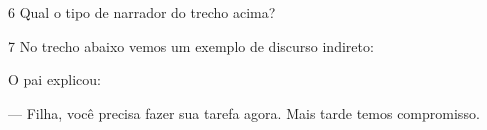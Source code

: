 
\num{6} Qual o tipo de narrador do trecho acima?


\pagebreak




\num{7} No trecho abaixo vemos um exemplo de discurso indireto:

\begin{myquote}

O pai explicou: 

--- Filha, você precisa fazer sua tarefa agora. Mais tarde
temos compromisso.

\end{myquote}

